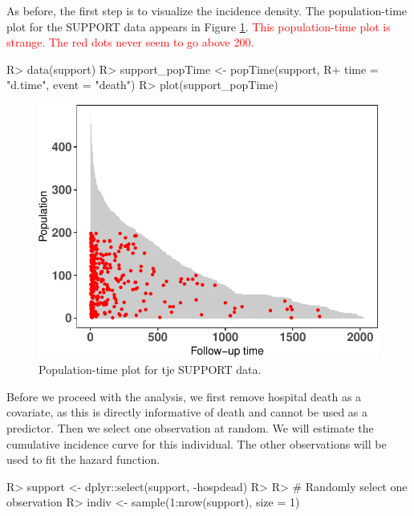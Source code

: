 \documentclass[
]{jss}
\begin{document}
As before, the first step is to visualize the incidence density. The
population-time plot for the SUPPORT data appears in Figure
\ref{fig:support-poptime}.
\textcolor{red}{This population-time plot is strange. The red dots never seem to go above 200.}

\begin{CodeChunk}

\begin{CodeInput}
R> data(support)
R> support_popTime <- popTime(support,
R+                            time = "d.time", event = "death")
R> plot(support_popTime)
\end{CodeInput}
\begin{figure}

{\centering \includegraphics{../figures/support-poptime-1} 

}

\caption{\label{fig:support-poptime} Population-time plot for tje SUPPORT data.}\label{fig:support-poptime}
\end{figure}
\end{CodeChunk}

Before we proceed with the analysis, we first remove hospital death as a
covariate, as this is directly informative of death and cannot be used
as a predictor. Then we select one observation at random. We will
estimate the cumulative incidence curve for this individual. The other
observations will be used to fit the hazard function.

\begin{CodeChunk}

\begin{CodeInput}
R> support <- dplyr::select(support, -hospdead)
R> 
R> # Randomly select one observation
R> indiv <- sample(1:nrow(support), size = 1)
\end{CodeInput}
\end{CodeChunk}
\end{document}
